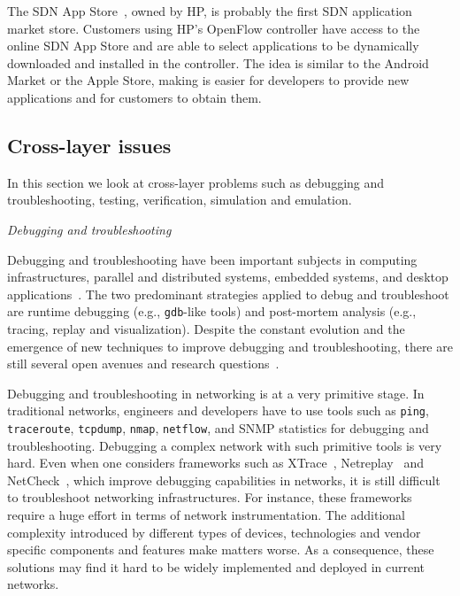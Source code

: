 The SDN App Store~\cite{duckett2013,hp2013-2}, owned by HP, is probably the first SDN 
application market store. Customers using HP's OpenFlow controller have access to the online SDN App Store 
and are able to select applications to be dynamically downloaded and installed in the controller. 
The idea is similar to the Android Market or the Apple Store, making is easier for developers to provide 
new applications and for customers to obtain them.

\subsection{Cross-layer issues}
\label{sec:debuggingandtroubleshooting}

In this section we look at cross-layer problems such as debugging and troubleshooting, testing, verification, simulation and emulation.

\vspace{2mm}
\noindent \textit{Debugging and troubleshooting}

Debugging and troubleshooting have been important subjects in computing infrastructures, 
parallel and distributed systems, embedded systems, and desktop 
applications~\cite{sigelman2010,layman2013,erlingsson2012,tomaselli2013,tan2010,fonseca2007,trivedi2014}. 
The two predominant strategies applied to debug and troubleshoot are runtime debugging 
(e.g., \texttt{gdb}-like tools) and post-mortem analysis (e.g., tracing, replay and visualization).
Despite the constant evolution and the emergence of new techniques to improve debugging and troubleshooting, 
there are still several open avenues and research questions~\cite{layman2013}.


Debugging and troubleshooting in networking is at a very primitive stage.
In traditional networks, engineers and developers have 
to use tools such as \texttt{ping}, \texttt{traceroute}, \texttt{tcpdump}, \texttt{nmap}, 
\texttt{netflow}, and SNMP statistics for debugging and troubleshooting.
Debugging a complex 
network with such primitive tools is very hard.
Even when one considers frameworks such as
XTrace~\cite{fonseca2007}, Netreplay~\cite{anand2010} 
and NetCheck~\cite{zhuang2014}, which improve debugging capabilities in networks, it is still difficult 
to troubleshoot networking infrastructures. For instance, these frameworks require a huge effort in terms of 
network instrumentation. The additional complexity introduced 
by different types of devices, technologies and vendor specific components and features make matters worse.
As a consequence, 
these solutions may find it hard to be widely implemented and deployed in current networks.

